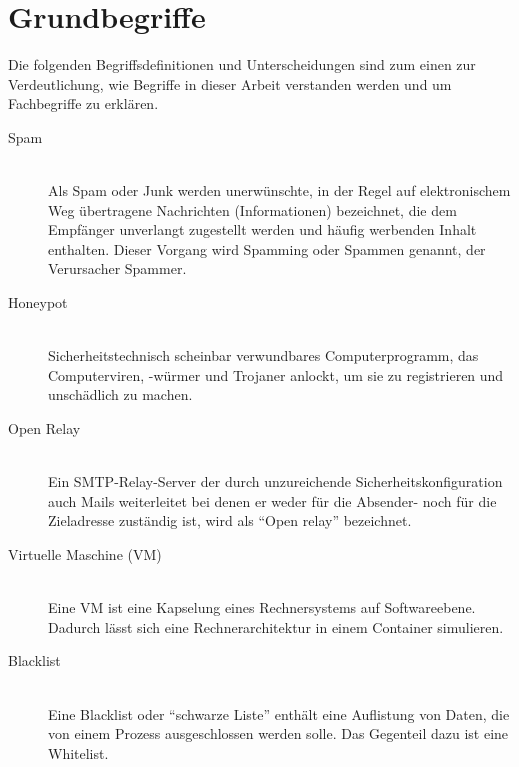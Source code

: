 \documentclass[a4paper,11pt,singlespacing]{article}
\begin{document}


\section{Grundbegriffe}\label{sec:Grundbegriffe}
	Die folgenden Begriffsdefinitionen und Unterscheidungen sind zum einen zur Verdeutlichung, wie Begriffe in dieser Arbeit verstanden werden und um Fachbegriffe zu erklären.
	
	\begin{description}
	\item[Spam\label{itm:Spam}]\hfill \\
		Als Spam oder Junk werden unerwünschte, in der Regel auf elektronischem Weg übertragene Nachrichten (Informationen) bezeichnet, die dem Empfänger unverlangt zugestellt werden und häufig werbenden Inhalt enthalten. Dieser Vorgang wird Spamming oder Spammen genannt, der Verursacher Spammer.\cite{Spam}
	\item[Honeypot\label{itm:Honeypot}]\hfill \\
		Sicherheitstechnisch scheinbar verwundbares Computerprogramm, das Computerviren, -würmer und Trojaner anlockt, um sie zu registrieren und unschädlich zu machen.\cite{Honeypot}
	\item[Open Relay\label{itm:OpenRelay}]\hfill \\
		Ein SMTP-Relay-Server der durch unzureichende Sicherheitskonfiguration auch Mails weiterleitet bei denen er weder für die Absender- noch für die Zieladresse zuständig ist, wird als "`Open relay"' bezeichnet.\cite{SMTP-Relay-Server}
	\item[Virtuelle Maschine (VM)\label{itm:VirtuelleMaschine}]\hfill \\
		Eine VM ist eine Kapselung eines Rechnersystems auf Softwareebene. Dadurch lässt sich eine Rechnerarchitektur in einem Container simulieren. \cite{VM}
	\item[Blacklist \label{itm:Blacklist}]\hfill \\
		Eine Blacklist oder "`schwarze Liste"' enthält eine Auflistung von Daten, die von einem Prozess ausgeschlossen werden solle. Das Gegenteil dazu ist eine Whitelist. \cite{Blacklist}

\end{description}
\end{document}

